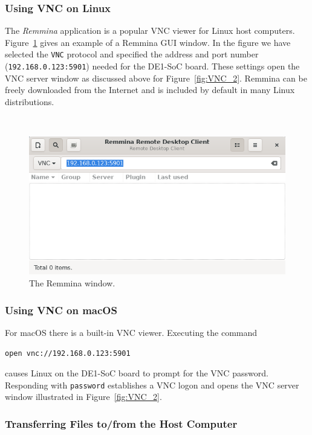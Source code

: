 \documentclass[11pt, twoside, pdftex]{article}
\begin{document}
\subsubsection{Using VNC on Linux}

The {\it Remmina} application is a popular VNC viewer for Linux host computers.
Figure~\ref{fig:Remmina} gives an example of a Remmina GUI window. In the figure we have 
selected the \texttt{VNC} protocol and specified the address and port number 
(\texttt{192.168.0.123:5901}) needed for the DE1-SoC board. These settings
open the VNC server window as discussed above for Figure~\ref{fig:VNC_2}.
Remmina can be freely downloaded from the Internet and is included by default in many
Linux distributions.

~\\
\begin{figure}[H]
   \begin{center}
       \includegraphics[scale=.8]{figures/remmina.png}
   \end{center}
   \caption{The Remmina window.}
	\label{fig:Remmina}
\end{figure}

\subsubsection{Using VNC on macOS}

For macOS there is a built-in VNC viewer. Executing the command

\texttt{open vnc://192.168.0.123:5901}

causes Linux on the DE1-SoC board to prompt for the VNC password. Responding with
\texttt{password} establishes a VNC logon and opens the VNC server window 
illustrated in Figure~\ref{fig:VNC_2}.

\subsubsection{Transferring Files to/from the Host Computer}
\label{sec:ftp}
\end{document}
